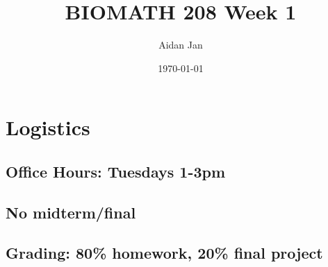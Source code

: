 \documentclass[10pt]{article}
\title{BIOMATH 208 Week 1}
\author{Aidan Jan}
\date{\today}
\begin{document}
\maketitle
\section*{Logistics}
\subsection*{Office Hours: Tuesdays 1-3pm}
\subsection*{No midterm/final}
\subsection*{Grading: 80\% homework, 20\% final project}
\end{document}
